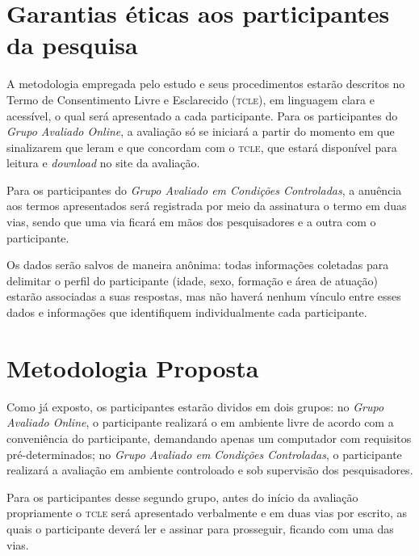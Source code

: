 \documentclass[a4paper,11pt,titlepage,singlespacing]{article}
\newcommand\todo[1]{\textcolor{red}{#1}}
\begin{document}
\section{Garantias éticas aos participantes da pesquisa}
\noindent A metodologia empregada pelo estudo e seus procedimentos estarão descritos no Termo de Consentimento Livre e Esclarecido (\textsc{tcle}), em linguagem clara e acessível, o qual será apresentado a cada participante. Para os participantes do \textit{Grupo Avaliado Online}, a avaliação só se iniciará a partir do momento em que sinalizarem que leram e que concordam com o \textsc{tcle}, que estará disponível para leitura e \textit{download} no site da avaliação. 

Para os participantes do \textit{Grupo Avaliado em Condições Controladas}, a anuência aos termos apresentados será registrada por meio da assinatura o termo em duas vias, sendo que uma via ficará em mãos dos pesquisadores e a outra com o participante.

Os dados serão salvos de maneira anônima: todas informações coletadas para delimitar o perfil do participante (idade, sexo, formação e área de atuação) estarão associadas a suas respostas, mas não haverá nenhum vínculo entre esses dados e informações que identifiquem individualmente cada participante.



\section{Metodologia Proposta}

\noindent Como já exposto, os participantes estarão dividos em dois grupos: no \textit{Grupo Avaliado Online}, o participante realizará o em ambiente livre de acordo com a conveniência do participante, demandando apenas um computador com requisitos pré-determinados; no \textit{Grupo Avaliado em Condições Controladas}, o participante realizará a avaliação em ambiente controloado e sob supervisão dos pesquisadores.

Para os participantes desse segundo grupo, antes do início da avaliação propriamente o \textsc{tcle} será apresentado verbalmente e em duas vias por escrito, as quais o participante deverá ler e assinar para prosseguir, ficando com uma das vias.

\end{document}
